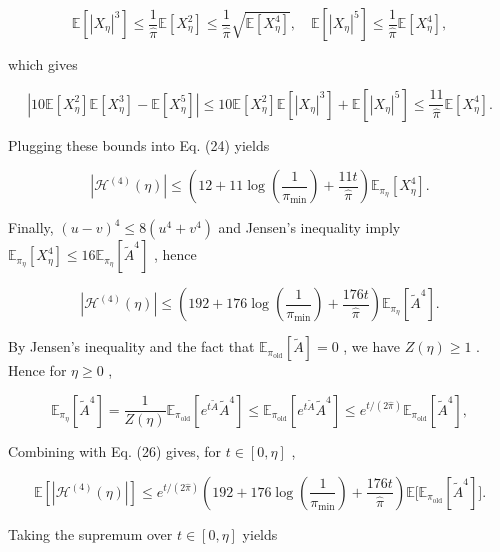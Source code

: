 \documentclass[
  10
]{article}
\begin{document}
\[
\mathbb {E} [ | X _ {\eta} | ^ {3} ] \leq \frac {1}{\hat {\pi}} \mathbb {E} [ X _ {\eta} ^ {2} ] \leq \frac {1}{\hat {\pi}} \sqrt {\mathbb {E} [ X _ {\eta} ^ {4} ]}, \quad \mathbb {E} [ | X _ {\eta} | ^ {5} ] \leq \frac {1}{\hat {\pi}} \mathbb {E} [ X _ {\eta} ^ {4} ],
\]

which gives

\[
\left| 1 0 \mathbb {E} [ X _ {\eta} ^ {2} ] \mathbb {E} [ X _ {\eta} ^ {3} ] - \mathbb {E} [ X _ {\eta} ^ {5} ] \right| \leq 1 0 \mathbb {E} [ X _ {\eta} ^ {2} ] \mathbb {E} [ | X _ {\eta} | ^ {3} ] + \mathbb {E} [ | X _ {\eta} | ^ {5} ] \leq \frac {1 1}{\hat {\pi}} \mathbb {E} [ X _ {\eta} ^ {4} ].
\]

Plugging these bounds into Eq. (24) yields

\[
\left| \mathcal {H} ^ {(4)} (\eta) \right| \leq \left(1 2 + 1 1 \log \left(\frac {1}{\pi_ {\min}}\right) + \frac {1 1 t}{\hat {\pi}}\right) \mathbb {E} _ {\pi_ {\eta}} \left[ X _ {\eta} ^ {4} \right]. \tag {25}
\]

Finally, \(( u - v ) ^ { 4 } \leq 8 ( u ^ { 4 } + v ^ { 4 } )\) and
Jensen's inequality imply
\(\mathbb { E } _ { \pi _ { \eta } } [ X _ { \eta } ^ { 4 } ] \le 1 6 \mathbb { E } _ { \pi _ { \eta } } [ \tilde { A } ^ { 4 } ]\)
, hence

\[
\left| \mathcal {H} ^ {(4)} (\eta) \right| \leq \left(1 9 2 + 1 7 6 \log \left(\frac {1}{\pi_ {\min}}\right) + \frac {1 7 6 t}{\hat {\pi}}\right) \mathbb {E} _ {\pi_ {\eta}} \left[ \tilde {A} ^ {4} \right]. \tag {26}
\]

By Jensen's inequality and the fact that
\(\mathbb { E } _ { \pi _ { \mathrm { o l d } } } [ \tilde { A } ] = 0\)
, we have \(Z ( \eta ) \ge 1\) . Hence for \(\eta \geq 0\) ,

\[
\mathbb {E} _ {\pi_ {\eta}} [ \tilde {A} ^ {4} ] = \frac {1}{Z (\eta)} \mathbb {E} _ {\pi_ {\mathrm{old}}} [ e ^ {t \tilde {A}} \tilde {A} ^ {4} ] \leq \mathbb {E} _ {\pi_ {\mathrm{old}}} [ e ^ {t \tilde {A}} \tilde {A} ^ {4} ] \leq e ^ {t / (2 \hat {\pi})} \mathbb {E} _ {\pi_ {\mathrm{old}}} [ \tilde {A} ^ {4} ],
\]

Combining with Eq. (26) gives, for \(t \in [ 0 , \eta ]\) ,

\[
\mathbb {E} [ | \mathcal {H} ^ {(4)} (\eta) | ] \leq e ^ {t / (2 \hat {\pi})} \left(1 9 2 + 1 7 6 \log (\frac {1}{\pi_ {\mathrm{min}}}) + \frac {1 7 6 t}{\hat {\pi}}\right) \mathbb {E} \Big [ \mathbb {E} _ {\pi_ {\mathrm{old}}} [ \tilde {A} ^ {4} ] \Big ].
\]

Taking the supremum over \(t \in [ 0 , \eta ]\) yields
\end{document}
